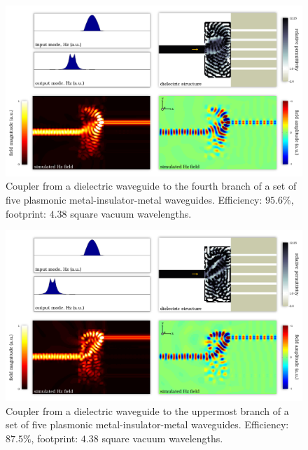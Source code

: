 \begin{figure}[h!]
    \centering
    \includegraphics[width=\textwidth]{p3/20}
    \caption{
        Coupler from a dielectric waveguide to the 
            fourth branch of a set of five plasmonic 
            metal-insulator-metal waveguides.
        Efficiency: $95.6\%$,
        footprint: $4.38$ square vacuum wavelengths.
        }
\end{figure}
\begin{figure}[h!]
    \centering
    \includegraphics[width=\textwidth]{p3/21}
    \caption{
        Coupler from a dielectric waveguide to the 
            uppermost branch of a set of five plasmonic 
            metal-insulator-metal waveguides.
        Efficiency: $87.5\%$,
        footprint: $4.38$ square vacuum wavelengths.
        }
\end{figure}
\clearpage

